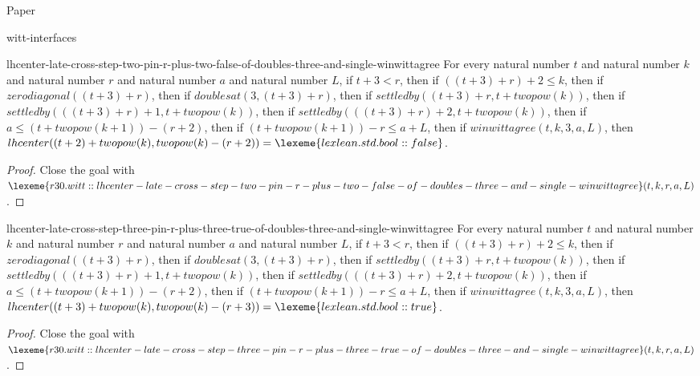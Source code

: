 \begin{lexlean}{Paper}
\begin{section}{witt-interfaces}
  \begin{theorem}{lhcenter-late-cross-step-two-pin-r-plus-two-false-of-doubles-three-and-single-winwittagree}
  For every natural number \(t\) and natural number \(k\) and natural number \(r\) and natural number \(a\) and natural number \(L\), if \(t + 3 < r\), then if \(((t + 3) + r) + 2 ≤ k\), then if \(zerodiagonal((t + 3) + r)\), then if \(doublesat(3, (t + 3) + r)\), then if \(settledby((t + 3) + r, t + twopow(k))\), then if \(settledby(((t + 3) + r) + 1, t + twopow(k))\), then if \(settledby(((t + 3) + r) + 2, t + twopow(k))\), then if \(a ≤ (t + twopow(k + 1)) - (r + 2)\), then if \((t + twopow(k + 1)) - r ≤ a + L\), then if \(winwittagree(t, k, 3, a, L)\), then \(lhcenter((t + 2) + twopow(k), twopow(k) - (r + 2)) = \lexeme{lexlean.std.bool::false}\).
  \begin{proof}
  Close the goal with \(\lexeme{r30.witt::lhcenter-late-cross-step-two-pin-r-plus-two-false-of-doubles-three-and-single-winwittagree}(t, k, r, a, L)\).
  \end{proof}
  \end{theorem}

  \begin{theorem}{lhcenter-late-cross-step-three-pin-r-plus-three-true-of-doubles-three-and-single-winwittagree}
  For every natural number \(t\) and natural number \(k\) and natural number \(r\) and natural number \(a\) and natural number \(L\), if \(t + 3 < r\), then if \(((t + 3) + r) + 2 ≤ k\), then if \(zerodiagonal((t + 3) + r)\), then if \(doublesat(3, (t + 3) + r)\), then if \(settledby((t + 3) + r, t + twopow(k))\), then if \(settledby(((t + 3) + r) + 1, t + twopow(k))\), then if \(settledby(((t + 3) + r) + 2, t + twopow(k))\), then if \(a ≤ (t + twopow(k + 1)) - (r + 2)\), then if \((t + twopow(k + 1)) - r ≤ a + L\), then if \(winwittagree(t, k, 3, a, L)\), then \(lhcenter((t + 3) + twopow(k), twopow(k) - (r + 3)) = \lexeme{lexlean.std.bool::true}\).
  \begin{proof}
  Close the goal with \(\lexeme{r30.witt::lhcenter-late-cross-step-three-pin-r-plus-three-true-of-doubles-three-and-single-winwittagree}(t, k, r, a, L)\).
  \end{proof}
  \end{theorem}


\end{section}
\end{lexlean}
